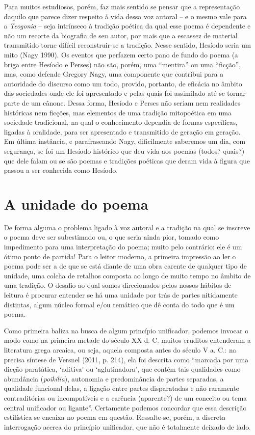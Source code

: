 Para muitos estudiosos, porém, faz mais sentido se pensar que a
representação daquilo que parece dizer respeito à vida dessa voz autoral
-- e o mesmo vale para a \emph{Teogonia} -- seja intrínseco à tradição
poética da qual esse poema é dependente e não um recorte da biografia de
seu autor, por mais que a escassez de material transmitido torne difícil
reconstruir-se a tradição. Nesse sentido, Hesíodo seria um mito (Nagy
1990). Os eventos que perfazem certo pano de fundo do poema (a briga
entre Hesíodo e Perses) não são, porém, uma ``mentira'' ou uma
``ficção'', mas, como defende Gregory Nagy, uma componente que contribui
para a autoridade do discurso como um todo, provido, portanto, de
eficácia no âmbito das sociedades onde ele foi apresentado e pelas quais
foi assimilado até se tornar parte de um cânone. Dessa forma, Hesíodo e
Perses não seriam nem realidades históricas nem ficções, mas elementos
de uma tradição mitopoética em uma sociedade tradicional, na qual o
conhecimento dependia de formas específicas, ligadas à oralidade, para
ser apresentado e transmitido de geração em geração. Em última
instância, e parafraseando Nagy, dificilmente saberemos um dia, com
segurança, se foi um Hesíodo histórico que deu vida aos poemas (todos?
quais?) que dele falam ou se são poemas e tradições poéticas que deram
vida à figura que passou a ser conhecida como Hesíodo.

\section{A unidade do poema}

De forma alguma o problema ligado à voz autoral e a tradição na qual se
inscreve o poema deve ser subestimado ou, o que seria ainda pior, tomado
como impedimento para uma interpretação do poema; muito pelo contrário:
ele é um ótimo ponto de partida! Para o leitor moderno, a primeira
impressão ao ler o poema pode ser a de que se está diante de uma obra
carente de qualquer tipo de unidade, uma colcha de retalhos composta ao
longo de muito tempo no âmbito de uma tradição. O desafio ao qual somos
direcionados pelos nossos hábitos de leitura é procurar entender se há
uma unidade por trás de partes nitidamente distintas, algum núcleo
formal e/ou temático que dê conta do todo que é um poema.

Como primeira baliza na busca de algum princípio unificador, podemos
invocar o modo como na primeira metade do século XX d. C. muitos
eruditos entenderam a literatura grega arcaica, ou seja, aquela composta
antes do século V a. C.: na precisa síntese de Versnel (2011, p. 214),
ela foi descrita como ``marcada por uma dicção paratática, `aditiva' ou
`aglutinadora', que contém tais qualidades como abundância
(\emph{poikilia}), autonomia e predominância de partes separadas, a
qualidade funcional delas, a ligação entre partes disparatadas e não
raramente contraditórias ou incompatíveis e a carência (aparente?) de um
conceito ou tema central unificador ou ligante''. Certamente podemos
concordar que essa descrição estilística se encaixa no poema em questão.
Ressalte-se, porém, a discreta interrogação acerca do princípio
unificador, que não é totalmente deixado de lado.

